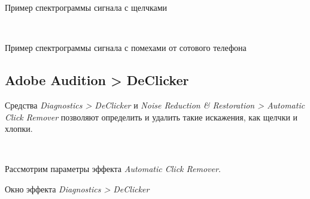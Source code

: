 \documentclass{beamer}
\begin{document}
\begin{frame}
Пример спектрограммы сигнала с щелчками

~

Пример спектрограммы сигнала с помехами от сотового телефона
\end{frame}

\subsection{Adobe Audition > DeClicker}
\begin{frame}
Средства \textit{Diagnostics > DeClicker} и \textit{Noise Reduction \& Restoration > Automatic Click Remover} позволяют определить и удалить такие искажения, как щелчки и хлопки.

~

Рассмотрим параметры эффекта \textit{Automatic Click Remover}.

\end{frame}

\begin{frame}
Окно эффекта \textit{Diagnostics > DeClicker}
\end{frame}
\end{document}
